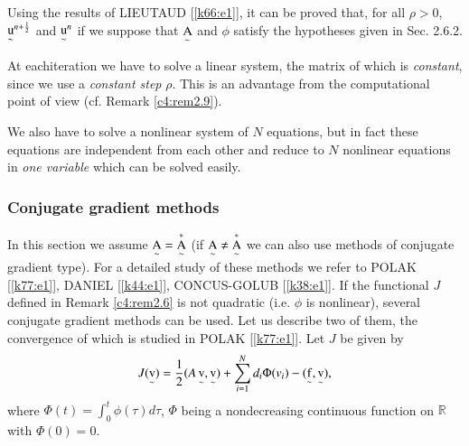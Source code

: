 Using the results of LIEUTAUD [\ref{k66:e1}], it can be proved that,
for all $\rho > 0$, ${\operatorname*{u} \limits_\sim}^{n+\frac{1}{2}}$ and ${\operatorname*{u}
\limits_\sim}^n$ if we suppose that $\operatorname*{A} \limits_\sim$ and $\phi$
satisfy the hypotheses given in Sec. 2.6.2. 

\begin{remark}\label{c4:rem2.16}%
At each\pageoriginale  iteration we have to solve a linear system, the
matrix of which is  {\em constant}, since we use a {\em constant step}
$\rho$. This is an advantage from the computational point of view
(cf. Remark \ref{c4:rem2.9}). 

We also have to solve a nonlinear system of $N$ equations, but in fact
these equations are independent from each other and reduce to $N$
nonlinear equations in  {\em one variable} which can be solved
easily. 
\end{remark}

\subsubsection{Conjugate gradient methods}\label{c4:sss2.6.7} 

In this section we assume $\operatorname*{A} \limits_\sim = \operatorname*{A} \limits_ \sim ^*$ (if
$\operatorname*{A} \limits_\sim \neq \operatorname*{A} \limits_\sim ^*$ we can also use methods of
conjugate gradient type). For a detailed study of these methods we
refer to POLAK [\ref{k77:e1}], DANIEL [\ref{k44:e1}], CONCUS-GOLUB
[\ref{k38:e1}]. If the functional
$J$ defined in Remark \ref{c4:rem2.6} is not quadratic (i.e. $\phi$ is
nonlinear), several conjugate gradient methods can be used. Let us
describe two of them, the convergence of which is studied in POLAK
[\ref{k77:e1}]. Let $J$ be given by  
$$
J(\operatorname*{v} \limits_ \sim) = \frac{1}{2} (A \operatorname*{v} \limits _\sim , \operatorname*{v} \limits
_\sim) + \sum^N_{i=1} d_i \Phi (v_i) -(\operatorname*{f} \limits_ \sim, \operatorname*{v} \limits
_\sim), 
$$
where $\Phi (t) = \int^t_0 \phi(\tau) d\tau$, $\Phi$ being a
nondecreasing continuous function on $\mathbb{R}$ with $\Phi(0) = 0$. 

